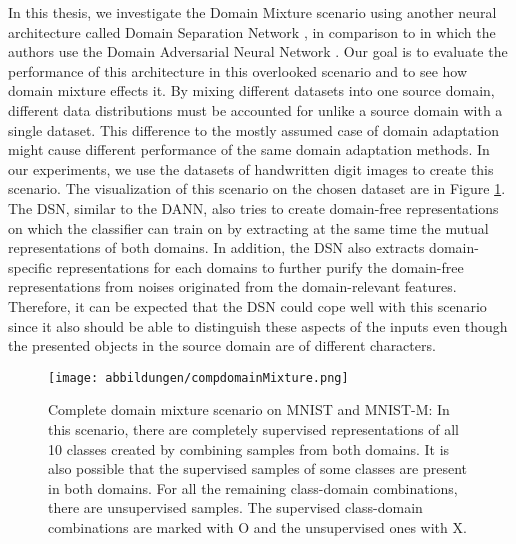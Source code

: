 In this thesis, we investigate the Domain Mixture scenario using another neural architecture called Domain Separation Network \cite{DSN}, in comparison to \cite{domainMixture} in which the authors use the Domain Adversarial Neural Network \cite{dannGanin}. Our goal is to evaluate the performance of this architecture in this overlooked scenario and to see how domain mixture effects it. By mixing different datasets into one source domain, different data distributions must be accounted for unlike a source domain with a single dataset. This difference to the mostly assumed case of domain adaptation might cause different performance of the same domain adaptation methods. In our experiments, we use the datasets of handwritten digit images to create this scenario. The visualization of this scenario on the chosen dataset are in Figure \ref{fig:compdomainDA}. The DSN, similar to the DANN, also tries to create domain-free representations on which the classifier can train on by extracting at the same time the mutual representations of both domains. In addition, the DSN also extracts domain-specific representations for each domains to further purify the domain-free representations from noises originated from the domain-relevant features. Therefore, it can be expected that the DSN could cope well with this scenario since it also should be able to distinguish these aspects of the inputs even though the presented objects in the source domain are of different characters.

\begin{figure}[tbh]
  \centering
    \texttt{[image: abbildungen/compdomainMixture.png]}
    \caption{Complete domain mixture scenario on MNIST and MNIST-M: In this scenario, there are completely supervised representations of all 10 classes created by combining samples from both domains. It is also possible that the supervised samples of some classes are present in both domains. For all the remaining class-domain combinations, there are unsupervised samples. The supervised class-domain combinations are marked with O and the unsupervised ones with X.} 
  \label{fig:compdomainDA}
\end{figure}


